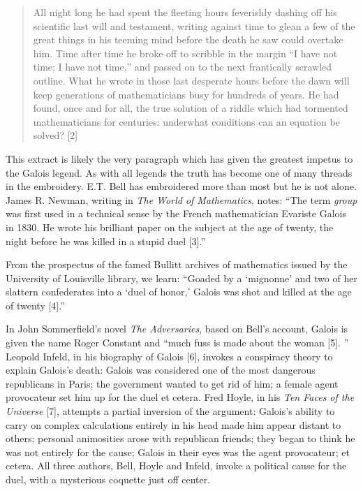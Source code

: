 \documentclass[12pt]{article}
\begin{document}
\begin{quote}
All night long he had spent the fleeting hours feverishly dashing off his scientific last will and testament, writing against time to glean a few of the great things in his teeming mind before the death he saw could overtake him. Time after time he broke off to scribble in the margin ``I have not time; I have not time,'' and passed on to the next frantically scrawled outline. What he wrote in those last desperate hours before the dawn will keep generations of mathematicians busy for hundreds of years. He had found, once and for all, the true solution of a riddle which had tormented mathematicians for centuries: underwhat conditions can an equation be solved? [2]
\end{quote}
This extract is likely the very paragraph which has given the greatest impetus to the Galois legend. As with all legends the truth has become one of many threads in the embroidery. E.T. Bell has embroidered more than most but he is not alone. James R. Newman, writing in {\it The World of Mathematics}, notes: ``The term {\it group} was first used in a technical sense by the French mathematician Evariste Galois in 1830. He wrote his brilliant paper on the subject at the age of twenty, the night before he was killed in a stupid duel [3].'' 

From the prospectus of the famed Bullitt archives of mathematics issued by the University of Louisville library, we learn: ``Goaded by a `mignonne' and two of her slattern confederates into a `duel of honor,' Galois was shot and killed at the age of twenty [4].'' 

In John Sommerfield's novel \emph{The Adversaries}, based on Bell's account, Galois is given the name Roger Constant and ``much fuss is made about the woman [5]. ''  Leopold Infeld, in his biography of Galois [6], invokes a conspiracy theory to explain Galois's death: Galois was considered one of the most dangerous republicans in Paris; the government wanted to get rid of him; a female agent provocateur set him up for the duel et cetera. Fred Hoyle, in his \emph{Ten Faces of the Universe} [7], attempts a partial inversion of the argument: Galois's ability to carry on complex calculations entirely in his head made him appear distant to others; personal animosities arose with republican friends; they began to think he was not entirely for the cause; Galois in their eyes was the agent provocateur; et cetera. All three authors, Bell, Hoyle and Infeld, invoke a political cause for the duel, with a mysterious coquette just off center.
\end{document}
